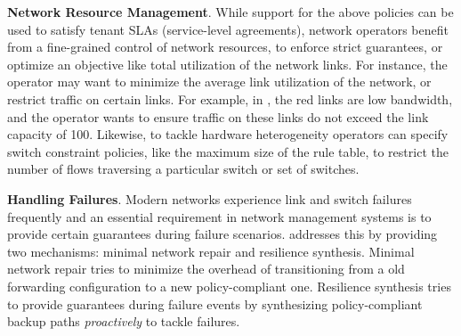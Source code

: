 \begin{compactitemize}
\item \textbf{Network Resource Management}. While support for the above
policies can be used to satisfy tenant SLAs (service-level agreements), network operators 
benefit from a fine-grained control of network resources, to enforce
strict guarantees, or optimize an objective like total utilization of the network
links. 
For instance, the operator may want to minimize the average link utilization 
of the network, or restrict traffic on certain links. For example, in ,
the red links are low bandwidth, and the operator wants to ensure
traffic on these links do not exceed the link capacity of 100.
  Likewise, to tackle hardware heterogeneity operators can specify
  switch constraint policies, like the maximum size of the rule table, to
  restrict the number of flows traversing a particular switch or set
  of switches.
 
 \item \textbf{Handling Failures}. Modern networks experience link and switch failures
 frequently and an essential requirement in network management systems is to
 provide certain guarantees during failure scenarios. \name addresses this by
 providing two mechanisms: minimal network repair and resilience synthesis. 
 Minimal network repair tries to minimize the overhead of transitioning from a
 old forwarding configuration to a new policy-compliant one. Resilience synthesis
 tries to provide guarantees during failure events by synthesizing policy-compliant
 backup paths \emph{proactively} to tackle failures.
\end{compactitemize}
